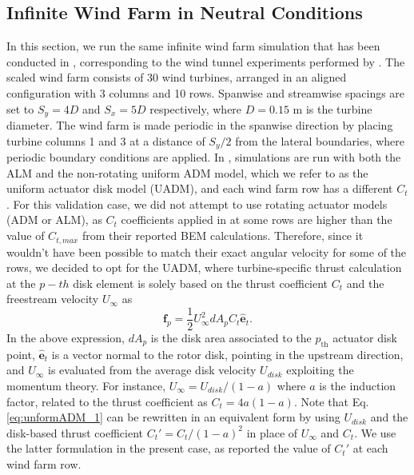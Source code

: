 \documentclass[journal abbreviation, manuscript]{copernicus}
\begin{document}
\subsection{Infinite Wind Farm in Neutral Conditions}
\label{subsec:infiniteWindFarm}
In this section, we run the same infinite wind farm simulation that has been conducted in \cite{2018_StevensEtAl}, corresponding to the wind tunnel experiments performed by \cite{2011_ChamorroPortéAgel}. The scaled wind farm consists of 30 wind turbines, arranged in an aligned configuration with 3 columns and 10 rows. Spanwise and streamwise spacings are set to $S_y=4D$ and $S_x=5D$ respectively, where $D=0.15$ m is the turbine diameter. The wind farm is made periodic in the spanwise direction by placing turbine columns 1 and 3 at a distance of $S_y/2$ from the lateral boundaries, where periodic boundary conditions are applied. In \cite{2018_StevensEtAl}, simulations are run with both the ALM and the non-rotating uniform ADM model, which we refer to as the uniform actuator disk model (UADM), and each wind farm row has a different $C_t$. For this validation case, we did not attempt to use rotating actuator models (ADM or ALM), as $C_t$ coefficients applied in \cite{2018_StevensEtAl} at some rows are higher than the value of $C_{t,max}$ from their reported BEM calculations. Therefore, since it wouldn't have been possible to match their exact angular velocity for some of the rows, we decided to opt for the UADM, where turbine-specific thrust calculation at the $p-th$ disk element is solely based on the thrust coefficient $C_t$ and the freestream velocity $U_{\infty}$ as 
\begin{equation}
	\mathbf{f}_p = \frac{1}{2} U_{\infty}^2dA_pC_t\widehat{\mathbf{e}}_t. \label{eq:unformADM_1}
\end{equation} 
In the above expression, $dA_p$ is the disk area associated to the $p_{\text{th}}$ actuator disk point, $\widehat{\mathbf{e}}_t$ is a vector normal to the rotor disk, pointing in the upstream direction, and $U_{\infty}$ is evaluated from the average disk velocity $U_{disk}$ exploiting the momentum theory. For instance, $U_{\infty} = U_{disk}/(1-a)$ where $a$ is the induction factor, related to the thrust coefficient as $C_t = 4a(1-a)$. Note that Eq. \ref{eq:unformADM_1} can be rewritten in an equivalent form by using $U_{disk}$ and the disk-based thrust coefficient $C_t' = C_t/(1-a)^2$ in place of $U_{\infty}$ and $C_t$. We use the latter formulation in the present case, as \cite{2018_StevensEtAl} reported the value of $C_t'$ at each wind farm row. 
\end{document}
